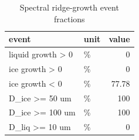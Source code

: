 \begin{table}[htbp]
\centering
\small
\caption{Spectral ridge-growth event fractions}
\label{tab:growth_bundle_events}
\begin{tabular}{llr}
\toprule
event & unit & value \\
\midrule
liquid growth > 0 & \% & 0 \\
ice growth > 0 & \% & 0 \\
ice growth < 0 & \% & 77.78 \\
D\_ice >= 50 um & \% & 100 \\
D\_ice >= 100 um & \% & 100 \\
D\_liq >= 10 um & \% & 0 \\
\bottomrule
\end{tabular}

\end{table}
